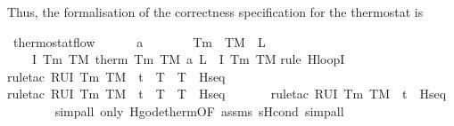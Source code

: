 \documentclass[envcountsame,envcountsect]{llncs}
\begin{document}
\begin{example}
Thus, the formalisation of the correctness specification for the thermostat is
\begin{isabellebody}
\isanewline
{}\isamarkupfalse%
\ thermostat{\isacharunderscore}flow{\isacharcolon}\ \isanewline
\ \ \ {\isachardoublequoteopen}{}\ {\isacharless}\ a{\isachardoublequoteclose}\ \ {\isachardoublequoteopen}{}\ {\isasymle}\ {\isasymtau}{\isachardoublequoteclose}\ \ {\isachardoublequoteopen}{}\ {\isacharless}\ T\isactrlsub m{\isachardoublequoteclose}\ \ {\isachardoublequoteopen}T\isactrlsub M\ {\isacharless}\ L{\isachardoublequoteclose}\isanewline
\ \ \ {\isachardoublequoteopen}\ \isactrlbold {\isacharbraceleft}I\ T\isactrlsub m\ T\isactrlsub M\isactrlbold {\isacharbraceright}\ therm\ T\isactrlsub m\ T\isactrlsub M\ a\ L\ {\isasymtau}\ \isactrlbold {\isacharbraceleft}I\ T\isactrlsub m\ T\isactrlsub M\isactrlbold {\isacharbraceright}{\isachardoublequoteclose}\isanewline
{}\isamarkupfalse%
{\isacharparenleft}rule\ H{\isacharunderscore}loopI{\isacharparenright}\isanewline
\ \ \ \ \isamarkupfalse%
{\isacharparenleft}rule{\isacharunderscore}tac\ R{\isacharequal}{\isachardoublequoteopen}U{\isacharparenleft}I\ T\isactrlsub m\ T\isactrlsub M\ {\isasymand}\ t{\isacharequal}{}\ {\isasymand}\ T\ {\isacharequal}\ T{\isacharparenright}{\isachardoublequoteclose}\ \ H{\isacharunderscore}seq{\isacharparenright}\isanewline
\ \ \ \ \ \isamarkupfalse%
{\isacharparenleft}rule{\isacharunderscore}tac\ R{\isacharequal}{\isachardoublequoteopen}U{\isacharparenleft}I\ T\isactrlsub m\ T\isactrlsub M\ {\isasymand}\ t{\isacharequal}{}\ {\isasymand}\ T\ {\isacharequal}\ T{\isacharparenright}{\isachardoublequoteclose}\ \ H{\isacharunderscore}seq{\isacharparenright}\isanewline
\ \ \ \ \ \ \isamarkupfalse%
{\isacharparenleft}rule{\isacharunderscore}tac\ R{\isacharequal}{\isachardoublequoteopen}U{\isacharparenleft}I\ T\isactrlsub m\ T\isactrlsub M\ {\isasymand}\ t{\isacharequal}{}{\isacharparenright}{\isachardoublequoteclose}\ \ H{\isacharunderscore}seq{\isacharparenright}\isanewline
\ \ \ \ \ \ \ \isamarkupfalse%
{\isacharparenleft}simp{\isacharunderscore}all\ only{\isacharcolon}\ H{\isacharunderscore}g{\isacharunderscore}ode{\isacharunderscore}therm{\isacharbrackleft}OF\ assms{\isacharparenleft}{}{\isacharcomma}{}{\isacharparenright}{\isacharbrackright}\ sH{\isacharunderscore}cond{\isacharcomma}\ simp{\isacharunderscore}all{\isacharparenright}\isanewline

\end{isabellebody}
\end{example}
\end{document}
